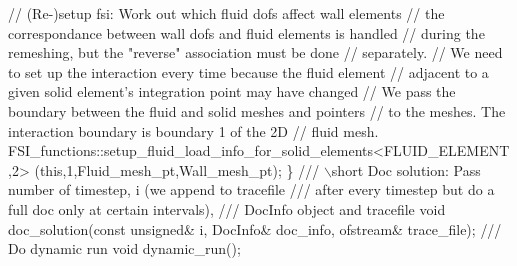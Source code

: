 \begin{DoxyCodeInclude}
   \textcolor{comment}{// (Re-)setup fsi: Work out which fluid dofs affect wall elements}
   \textcolor{comment}{// the correspondance between wall dofs and fluid elements is handled}
   \textcolor{comment}{// during the remeshing, but the "reverse" association must be done}
   \textcolor{comment}{// separately.}
   \textcolor{comment}{// We need to set up the interaction every time because the fluid element}
   \textcolor{comment}{// adjacent to a given solid element's integration point may have changed}
   \textcolor{comment}{// We pass the boundary between the fluid and solid meshes and pointers}
   \textcolor{comment}{// to the meshes. The interaction boundary is boundary 1 of the 2D }
   \textcolor{comment}{// fluid mesh.}
   FSI\_functions::setup\_fluid\_load\_info\_for\_solid\_elements<FLUID\_ELEMENT,2>
    (\textcolor{keyword}{this},1,Fluid\_mesh\_pt,Wall\_mesh\_pt);
  \}
\textcolor{comment}{}
\textcolor{comment}{ /// \(\backslash\)short Doc solution: Pass number of timestep, i (we append to tracefile}
\textcolor{comment}{ /// after every timestep but do a full doc only at certain intervals),}
\textcolor{comment}{ /// DocInfo object and tracefile}
\textcolor{comment}{} \textcolor{keywordtype}{void} doc\_solution(\textcolor{keyword}{const} \textcolor{keywordtype}{unsigned}& i, DocInfo& doc\_info, ofstream& trace\_file);
\textcolor{comment}{}
\textcolor{comment}{ /// Do dynamic run}
\textcolor{comment}{} \textcolor{keywordtype}{void} dynamic\_run();


\end{DoxyCodeInclude}
